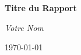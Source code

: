 \begin{titlepage}
	\centering
	\vspace*{2cm}
	{\Huge\bfseries Titre du Rapport\par}
	\vspace{1.5cm}
	{\Large\itshape Votre Nom\par}
	\vspace{2cm}
	{\Large \today\par}
\end{titlepage}